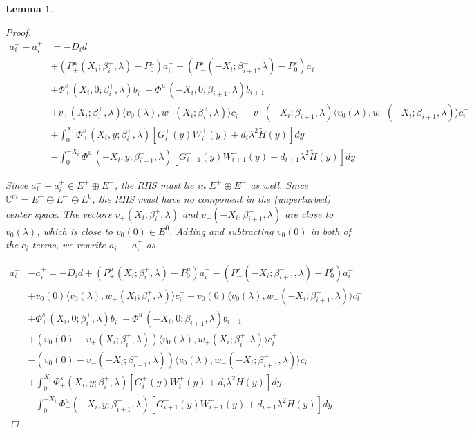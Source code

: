 \documentclass[12pt]{article}
\def\C{{\mathbb C}}
\newtheorem{lemma}{Lemma}
\begin{document}
\begin{lemma}
\begin{proof}
\begin{align*}
a_i^- - a_i^+ &= -D_i d  \\
&+ (P^u_+(X_i; \beta_i^+, \lambda) - P_0^u)a_i^+ - (P^s_-(-X_i; \beta_{i+1}^-,\lambda) - P_0^s)a_i^- \\
&+ \Phi^s_+(X_i, 0; \beta_i^+, \lambda)b_i^+ - \Phi^u_-(-X_i, 0; \beta_{i+1}^-, \lambda) b_{i+1}^- \\
&+ v_+(X_i; \beta_i^+, \lambda) \langle v_0(\lambda), w_+(X_i; \beta_i^+, \lambda) \rangle c_i^+ - v_-(-X_i; \beta_{i+1}^-, \lambda) \langle v_0(\lambda), w_-(-X_i; \beta_{i+1}^-, \lambda) \rangle c_i^- \\
&+ \int_0^{X_i} \Phi^s_+(X_i, y; \beta_i^+, \lambda) [ G_i^+(y) W_i^+(y) + d_i \lambda^2 \tilde{H}(y) ] dy \\
&- \int_0^{-X_i} \Phi^u_-(-X_i, y; \beta_{i+1}^-, \lambda) [ G_{i+1}^-(y) W_{i+1}^-(y) + d_{i+1} \lambda^2 \tilde{H}(y) ] dy
\end{align*}

Since $a_i^- - a_i^+ \in E^+ \oplus E^-$, the RHS must lie in $E^+ \oplus E^-$ as well. Since $\C^m = E^+ \oplus E^- \oplus E^0$, the RHS must have no component in the (unperturbed) center space. The vectors $v_+(X_i; \beta_i^+, \lambda)$ and $v_-(-X_i; \beta_{i+1}^-, \lambda)$ are close to $v_0(\lambda)$, which is close to $v_0(0) \in E^0$. Adding and subtracting $v_0(0)$ in both of the $c_i$ terms, we rewrite $a_i^- - a_i^+$ as

\begin{align*}
a_i^- &- a_i^+ = -D_i d + (P^u_+(X_i; \beta_i^+, \lambda) - P_0^u)a_i^+ - (P^s_-(-X_i; \beta_{i+1}^-, \lambda) - P_0^s)a_i^- \\
&+ v_0(0) \langle v_0(\lambda), w_+(X_i; \beta_i^+, \lambda) \rangle c_i^+ 
- v_0(0) \langle v_0(\lambda), w_-(-X_i; \beta_{i+1}^-, \lambda) \rangle c_i^- \\
&+ \Phi^s_+(X_i, 0; \beta_i^+, \lambda)b_i^+ - \Phi^u_-(-X_i, 0; \beta_{i+1}^-, \lambda)b_{i+1}^- \\
&+ (v_0(0) - v_+(X_i; \beta_i^+, \lambda)) \langle v_0(\lambda), w_+(X_i; \beta_i^+, \lambda) \rangle c_i^+ \\
&- (v_0(0) - v_-(-X_i; \beta_{i+1}^-, \lambda)) \langle v_0(\lambda), w_-(-X_i; \beta_{i+1}^-, \lambda) \rangle c_i^- \\
&+ \int_0^{X_i} \Phi^s_+(X_i, y; \beta_i^+, \lambda) [ G_i^+(y) W_i^+(y) + d_i \lambda^2 \tilde{H}(y) ] dy \\
&- \int_0^{-X_i} \Phi^u_-(-X_i, y; \beta_{i+1}^-, \lambda) [ G_{i+1}^-(y) W_{i+1}^-(y) + d_{i+1} \lambda^2 \tilde{H}(y) ] dy
\end{align*}


\end{proof}
\end{lemma}
\end{document}
